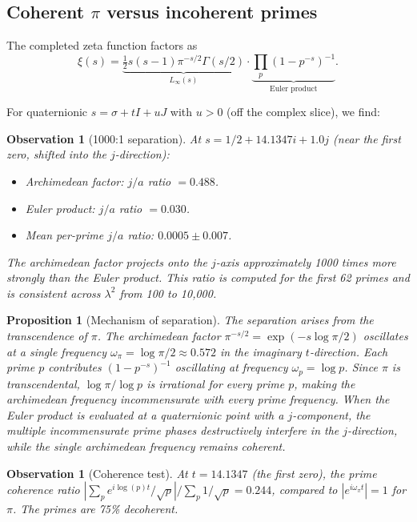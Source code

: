 \documentclass[11pt,a4paper]{article}
\newtheorem{proposition}[theorem]{Proposition}
\newtheorem{observation}[theorem]{Observation}
\theoremstyle{definition}
\begin{document}
\subsection{Coherent $\pi$ versus incoherent primes}

The completed zeta function factors as
\[
\xi(s) = \underbrace{\tfrac{1}{2}s(s-1)\pi^{-s/2}\Gamma(s/2)}_{L_\infty(s)} \cdot \underbrace{\prod_p (1 - p^{-s})^{-1}}_{\text{Euler product}}.
\]

For quaternionic $s = \sigma + tI + uJ$ with $u > 0$ (off the complex slice), we find:

\begin{observation}[1000:1 separation]\label{obs:separation}
At $s = 1/2 + 14.1347 i + 1.0 j$ (near the first zero, shifted into the $j$-direction):
\begin{itemize}
\item Archimedean factor: $j/a$ ratio $= 0.488$.
\item Euler product: $j/a$ ratio $= 0.030$.
\item Mean per-prime $j/a$ ratio: $0.0005 \pm 0.007$.
\end{itemize}
The archimedean factor projects onto the $j$-axis approximately 1000 times more strongly than the Euler product. This ratio is computed for the first 62 primes and is consistent across $\lambda^2$ from 100 to 10,000.
\end{observation}

\begin{proposition}[Mechanism of separation]
The separation arises from the transcendence of $\pi$. The archimedean factor $\pi^{-s/2} = \exp(-s \log\pi / 2)$ oscillates at a single frequency $\omega_\pi = \log\pi / 2 \approx 0.572$ in the imaginary $t$-direction. Each prime $p$ contributes $(1-p^{-s})^{-1}$ oscillating at frequency $\omega_p = \log p$. Since $\pi$ is transcendental, $\log\pi / \log p$ is irrational for every prime $p$, making the archimedean frequency incommensurate with every prime frequency. When the Euler product is evaluated at a quaternionic point with a $j$-component, the multiple incommensurate prime phases destructively interfere in the $j$-direction, while the single archimedean frequency remains coherent.
\end{proposition}

\begin{observation}[Coherence test]
At $t = 14.1347$ (the first zero), the prime coherence ratio $|\sum_p e^{i \log(p) t}/\sqrt{p}| / \sum_p 1/\sqrt{p} = 0.244$, compared to $|e^{i \omega_\pi t}| = 1$ for $\pi$. The primes are 75\% decoherent.
\end{observation}
\end{document}
